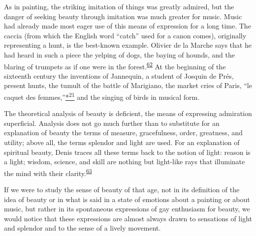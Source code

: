 As in painting, the striking imitation of things was greatly admired,
but the danger of seeking beauty through imitation was
\protect\hypertarget{20_ILLUSTRATIONS_FOLLOW_PAGE.xhtmlux5cux23page_324}{}{}much
greater for music. Music had already made most eager use of this means
of expression for a long time. The caccia (from which the English word
``catch'' used for a canon comes), originally representing a hunt, is
the best-known example. Olivier de la Marche says that he had heard in
such a piece the yelping of dogs, the baying of hounds, and the blaring
of trumpets as if one were in the
forest.\textsuperscript{\protect\hypertarget{20_ILLUSTRATIONS_FOLLOW_PAGE.xhtmlux5cux23id_350}{\protect\hyperlink{23_NOTES.xhtmlux5cux23page_434}{62}}}
At the beginning of the sixteenth century the inventions of Jannequin, a
student of Josquin de Prés, present hunts, the tumult of the battle of
Marigiano, the market cries of Paris, ``le caquet des
femmes,''\protect\hypertarget{20_ILLUSTRATIONS_FOLLOW_PAGE.xhtmlux5cux23id_2691}{\protect\hyperlink{23_NOTES.xhtmlux5cux23id_2692}{*\textsuperscript{21}}}
and the singing of birds in musical form.

The theoretical analysis of beauty is deficient, the means of expressing
admiration superficial. Analysis does not go much further than to
substitute for an explanation of beauty the terms of measure,
gracefulness, order, greatness, and utility; above all, the terms
splendor and light are used. For an explanation of spiritual beauty,
Denis traces all these terms back to the notion of light: reason is a
light; wisdom, science, and skill are nothing but light-like rays that
illuminate the mind with their
clarity.\textsuperscript{\protect\hypertarget{20_ILLUSTRATIONS_FOLLOW_PAGE.xhtmlux5cux23id_348}{\protect\hyperlink{23_NOTES.xhtmlux5cux23id_349}{63}}}

If we were to study the sense of beauty of that age, not in its
definition of the idea of beauty or in what is said in a state of
emotions about a painting or about music, but rather in its spontaneous
expressions of gay enthusiasm for beauty, we would notice that these
expressions are almost always drawn to sensations of light and splendor
and to the sense of a lively movement.

